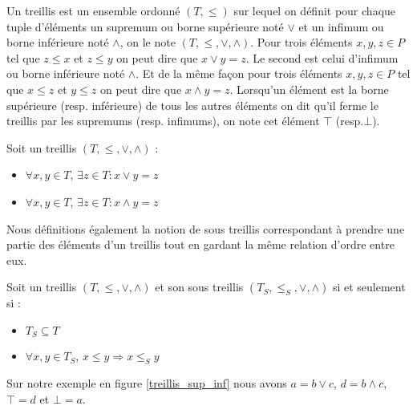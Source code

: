 Un treillis est un ensemble ordonné $(T, \leq)$ sur lequel on définit pour chaque tuple d'éléments un supremum ou borne supérieure noté $\vee$ et un infimum ou borne inférieure noté $\wedge$, on le note $(T, \leq, \vee, \wedge)$.  Pour trois éléments $x, y, z \in P$ tel que $z \leq x$ et $z \leq y$ on peut dire que $x \vee y = z$. Le second est celui d'infimum ou borne inférieure noté $\wedge$. Et de la même façon pour trois éléments $x, y, z \in P$ tel que $x \leq z$ et $y \leq z$ on peut dire que $x \wedge y = z$. Lorsqu'un élément est la borne supérieure (resp. inférieure) de tous les autres éléments on dit qu'il ferme le treillis par les supremums (resp. infimums), on note cet élément $\top$ (resp.$\bot$).

\begin{definition}[Treillis]
Soit un treillis $(T, \leq, \vee, \wedge)$ :
\begin{itemize}
	\item $\forall x, y \in T$, $\exists z \in T : x \vee y = z$
	\item $\forall x, y \in T$, $\exists z \in T : x \wedge y = z$
\end{itemize}
\end{definition}

Nous définitions également la notion de sous treillis correspondant à prendre une partie des éléments d'un treillis tout en gardant la même relation d'ordre entre eux.

\begin{definition}
Soit un treillis $(T, \leq, \vee, \wedge)$ et son sous treillis $(T_S, \leq_S, \vee, \wedge)$ si et seulement si :
\begin{itemize}
	\item $T_S \subseteq T$
	\item $\forall x, y \in T_S$, $x \leq y \Rightarrow x \leq_S y$
\end{itemize}
\end{definition}

Sur notre exemple en figure \ref{treillis_sup_inf} nous avons $a = b \vee c$, $d = b \wedge c$, $\top = d$ et $\bot = a$.


